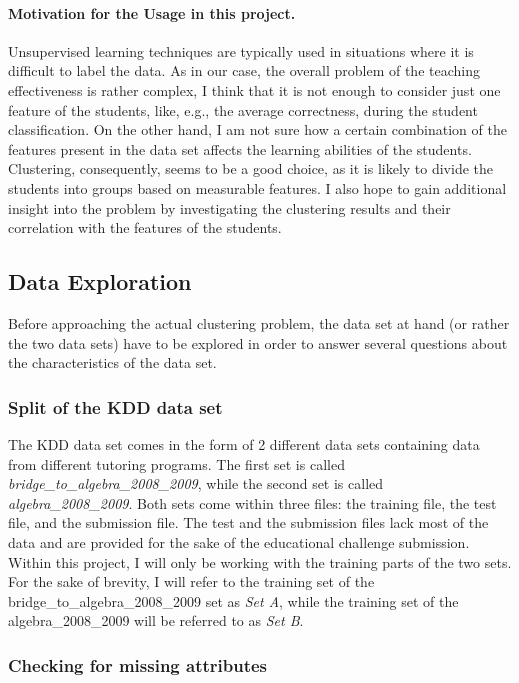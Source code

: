 \paragraph{Motivation for the Usage in this project.} Unsupervised learning techniques are typically used in situations where it is difficult to label the data. As in our case, the overall problem of the teaching effectiveness is rather complex, I think that it is not enough to consider just one feature of the students, like, e.g., the average correctness, during the student classification. On the other hand, I am not sure how a certain combination of the features present in the data set affects the learning abilities of the students. Clustering, consequently, seems to be a good choice, as it is likely to divide the students into groups based on measurable features. I also hope to gain additional insight into the problem by investigating the clustering results and their correlation with the features of the students.

\subsection{Data Exploration}

Before approaching the actual clustering problem, the data set at hand (or rather the two data sets) have to be explored in order to answer several questions about the characteristics of the data set.

\subsubsection{Split of the KDD data set}

The KDD data set comes in the form of 2 different data sets containing data from different tutoring programs. The first set is called \emph{bridge\_to\_algebra\_2008\_2009}, while the second set is called \emph{algebra\_2008\_2009}. Both sets come within three files: the training file, the test file, and the submission file. The test and the submission files lack most of the data and are provided for the sake of the educational challenge submission. Within this project, I will only be working with the training parts of the two sets. For the sake of brevity, I will refer to the training set of the bridge\_to\_algebra\_2008\_2009 set as \emph{Set A}, while the training set of the algebra\_2008\_2009 will be referred to as \emph{Set B}.

\subsubsection{Checking for missing attributes}

